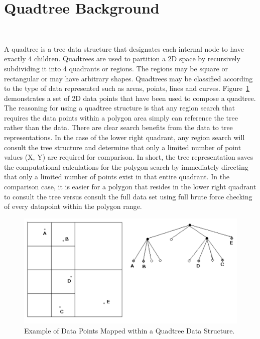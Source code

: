 %
%
%
%
%
\section{Quadtree Background}~\label{sec:quadtree_motivation}

A quadtree is a tree data structure that designates each internal node
to have exactly 4 children. Quadtrees are used to partition a 2D space
by recursively subdividing it into 4 quadrants or regions. The regions
may be square or rectangular or may have arbitrary shapes. Quadtrees
may be classified according to the type of data represented such as
areas, points, lines and curves. Figure~\ref{fig:quadtree}
demonstrates a set of 2D data points that have been used to compose a
quadtree. The reasoning for using a quadtree structure is that any
region search that requires the data points within a polygon area
simply can reference the tree rather than the data.  There are clear
search benefits from the data to tree representations. In the case of
the lower right quadrant, any region search will consult the tree
structure and determine that only a limited number of point values 
(X, Y) are required for comparison.  In short, the tree representation
saves the computational calculations for the polygon search by
immediately directing that only a limited number of points exist in
that entire quadrant.  In the comparison case, it is easier for a
polygon that resides in the lower right quadrant to consult the tree
versus consult the full data set using full brute force checking of
every datapoint within the polygon range.

\begin{figure} [H]
    \begin{center}
    \vspace{0.5in}
    \includegraphics[scale=0.5]{Images/webQuad}
    \vspace{0.5in}
    \end{center}
    \caption{Example of Data Points Mapped within a Quadtree Data Structure.}
    \label{fig:quadtree}
\end{figure}




